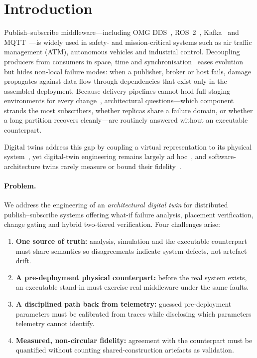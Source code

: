 \section{Introduction}
\label{sec:intro}

Publish--subscribe middleware---including OMG DDS~\citep{omg2015dds}, ROS~2~\citep{macenski2022robot}, Kafka~\citep{kreps2011kafka} and MQTT~\citep{oasis2019mqtt}---is widely used in safety- and mission-critical systems such as air traffic management (ATM), autonomous vehicles and industrial control. Decoupling producers from consumers in space, time and synchronisation~\citep{eugster2003faces} eases evolution but hides non-local failure modes: when a publisher, broker or host fails, damage propagates against data flow through dependencies that exist only in the assembled deployment. Because delivery pipelines cannot hold full staging environments for every change~\citep{humble2010continuous}, architectural questions---which component strands the most subscribers, whether replicas share a failure domain, or whether a long partition recovers cleanly---are routinely answered without an executable counterpart.

Digital twins address this gap by coupling a virtual representation to its physical system~\citep{grieves2017digital,tao2019}, yet digital-twin engineering remains largely ad hoc~\citep{dalibor2022cross,bordeleau2020towards}, and software-architecture twins rarely measure or bound their fidelity~\citep{wright2020tell}.

\paragraph{Problem.} We address the engineering of an \emph{architectural digital twin} for distributed publish--subscribe systems offering what-if failure analysis, placement verification, change gating and hybrid two-tiered verification. Four challenges arise:
\begin{enumerate}[leftmargin=*,nosep]
  \item \textbf{One source of truth:} analysis, simulation and the executable counterpart must share semantics so disagreements indicate system defects, not artefact drift.
  \item \textbf{A pre-deployment physical counterpart:} before the real system exists, an executable stand-in must exercise real middleware under the same faults.
  \item \textbf{A disciplined path back from telemetry:} guessed pre-deployment parameters must be calibrated from traces while disclosing which parameters telemetry cannot identify.
  \item \textbf{Measured, non-circular fidelity:} agreement with the counterpart must be quantified without counting shared-construction artefacts as validation.
\end{enumerate}

